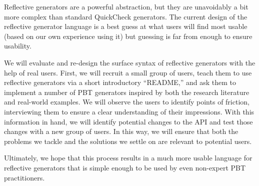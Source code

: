 Reflective generators are a powerful abstraction, but they are unavoidably a bit
more complex than standard QuickCheck generators. The current design of the
reflective generator language is a best guess at what users will find most
usable (based on our own experience using it) but guessing is far from enough to
ensure usability.

We will evaluate and re-design the surface syntax of reflective generators with
the help of real users.  First, we will recruit a small group of users, teach
them to use reflective generators via a short introductory ``README,'' and ask
them to implement a number of PBT generators inspired by both the research
literature and real-world examples. We will observe the users to identify points
of friction, interviewing them to ensure a clear understanding of their
impressions. With this information in hand, we will identify potential changes
to the API and test those changes with a new group of users. In this way, we
will ensure that both the problems we tackle and the solutions we settle on are
relevant to potential users.

Ultimately, we hope that this process results in a much more usable language for
reflective generators that is simple enough to be used by even non-expert PBT
practitioners.

%

